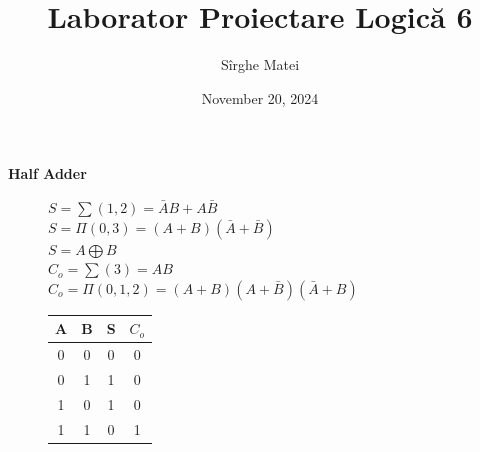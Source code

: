 \documentclass[12pt]{article}
\title{\bfseries Laborator Proiectare Logică 6}
\author{Sîrghe Matei}
\date{November 20, 2024}
\begin{document}
\maketitle

\begin{center}
    \large{\textbf{Half Adder}}
\end{center}

\renewcommand{\arraystretch}{1}

\begin{figure}[h!]
    \begin{minipage}{0.8\textwidth}
       $S=\sum(1,2)=\bar{A}B+A\bar{B}$\\
       $S=\Pi(0,3)=(A+B)(\bar{A}+\bar{B})$\\
       $S=A\bigoplus B$\\
       $C_{o}=\sum(3)=AB$\\
       $C_{o}=\Pi(0,1,2)=(A+B)(A+\bar{B})(\bar{A}+B)$\\
    \end{minipage}
    \hfill
    \begin{minipage}{0.18\textwidth}
        \begin{tabular}{|c|c|c|c|}
            \hline
            A & B & S & $C_{o}$ \\ \hline
            0 & 0 & 0 & 0 \\ \hline
            0 & 1 & 1 & 0 \\ \hline
            1 & 0 & 1 & 0 \\ \hline
            1 & 1 & 0 & 1 \\ \hline
        \end{tabular}
    \end{minipage}
\end{figure}
\end{document}
